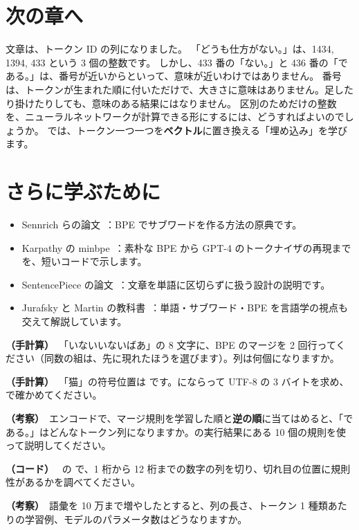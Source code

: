 \section*{次の章へ}

文章は、トークン ID の列になりました。
「どうも仕方がない。」は、1434, 1394, 433 という 3 個の整数です。
しかし、433 番の「ない。」と 436 番の「である。」は、番号が近いからといって、意味が近いわけではありません。
番号は、トークンが生まれた順に付いただけで、大きさに意味はありません。足したり掛けたりしても、意味のある結果にはなりません。
区別のためだけの整数を、ニューラルネットワークが計算できる形にするには、どうすればよいのでしょうか。
では、トークン一つ一つを\textbf{ベクトル}に置き換える「埋め込み」を学びます。

\section*{さらに学ぶために}

\begin{itemize}
\item Sennrich らの論文~\cite{sennrich2016neural}：BPE でサブワードを作る方法の原典です。
\item Karpathy の minbpe~\cite{karpathy2024minbpe}：素朴な BPE から GPT-4 のトークナイザの再現までを、短いコードで示します。
\item SentencePiece の論文~\cite{kudo2018sentencepiece}：文章を単語に区切らずに扱う設計の説明です。
\item Jurafsky と Martin の教科書~\cite{jurafsky2025slp}：単語・サブワード・BPE を言語学の視点も交えて解説しています。
\end{itemize}

\begin{exercises}
\item \textbf{（手計算）}\ 「いないいないばあ」の 8 文字に、BPE のマージを 2 回行ってください（同数の組は、先に現れたほうを選びます）。列は何個になりますか。
\item \textbf{（手計算）}\ 「猫」の符号位置は  です。にならって UTF-8 の 3 バイトを求め、 で確かめてください。
\item \textbf{（考察）}\ エンコードで、マージ規則を学習した順と\textbf{逆の順}に当てはめると、「である。」はどんなトークン列になりますか。の実行結果にある 10 個の規則を使って説明してください。
\item \textbf{（コード）}\  の  で、1 桁から 12 桁までの数字の列を切り、切れ目の位置に規則性があるかを調べてください。
\item \textbf{（考察）}\ 語彙を 10 万まで増やしたとすると、列の長さ、トークン 1 種類あたりの学習例、モデルのパラメータ数はどうなりますか。
\end{exercises}
